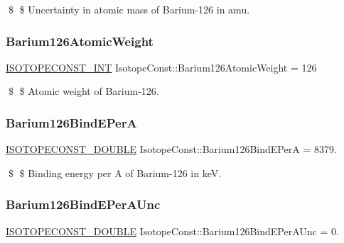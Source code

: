 \$ \$ Uncertainty in atomic mass of Barium-\/126 in amu. \mbox{\label{group___isotope_const-_barium-_ba126_gac938dacc16fb3333f3461d2f5d1b0ce1}} 
\subsubsection{\texorpdfstring{Barium126\+Atomic\+Weight}{Barium126AtomicWeight}}
{\footnotesize\ttfamily \mbox{\hyperlink{group___isotope_const-_macros_ga5f18360b3e99483a35c32d789e62621c}{I\+S\+O\+T\+O\+P\+E\+C\+O\+N\+S\+T\+\_\+\+I\+NT}} Isotope\+Const\+::\+Barium126\+Atomic\+Weight = 126}

\$ \$ Atomic weight of Barium-\/126. \mbox{\label{group___isotope_const-_barium-_ba126_gab44ae9cb8f4c5d191989a2b7f913e345}} 
\subsubsection{\texorpdfstring{Barium126\+Bind\+E\+PerA}{Barium126BindEPerA}}
{\footnotesize\ttfamily \mbox{\hyperlink{group___isotope_const-_macros_ga8f45a7272ce02c0b4c65c44636ed719a}{I\+S\+O\+T\+O\+P\+E\+C\+O\+N\+S\+T\+\_\+\+D\+O\+U\+B\+LE}} Isotope\+Const\+::\+Barium126\+Bind\+E\+PerA = 8379.}

\$ \$ Binding energy per A of Barium-\/126 in keV. \mbox{\label{group___isotope_const-_barium-_ba126_ga9cd4b0db64a5acc91539ae6b369e2ab5}} 
\subsubsection{\texorpdfstring{Barium126\+Bind\+E\+Per\+A\+Unc}{Barium126BindEPerAUnc}}
{\footnotesize\ttfamily \mbox{\hyperlink{group___isotope_const-_macros_ga8f45a7272ce02c0b4c65c44636ed719a}{I\+S\+O\+T\+O\+P\+E\+C\+O\+N\+S\+T\+\_\+\+D\+O\+U\+B\+LE}} Isotope\+Const\+::\+Barium126\+Bind\+E\+Per\+A\+Unc = 0.}

